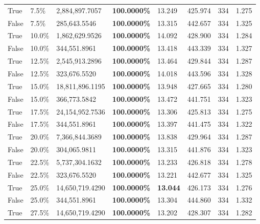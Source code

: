\begin{table}[H]
\begin{tabular}{lllrllll}
\cline{1-8}
True & 7.5\% & 2,884,897.7057 & \bfseries \color{red} 100.0000\% & 13.249 & 425.974 & 334 & 1.275 \\
\cline{1-8}
False & 7.5\% & \color{red} 285,643.5546 & \bfseries \color{red} 100.0000\% & 13.315 & 442.657 & 334 & 1.325 \\
\cline{1-8}
True & 10.0\% & 1,862,629.9526 & \bfseries \color{red} 100.0000\% & 14.092 & 428.900 & 334 & 1.284 \\
\cline{1-8}
False & 10.0\% & 344,551.8961 & \bfseries \color{red} 100.0000\% & 13.418 & 443.339 & 334 & 1.327 \\
\cline{1-8}
True & 12.5\% & 2,545,913.2896 & \bfseries \color{red} 100.0000\% & 13.464 & 429.844 & 334 & 1.287 \\
\cline{1-8}
False & 12.5\% & 323,676.5520 & \bfseries \color{red} 100.0000\% & 14.018 & 443.596 & 334 & 1.328 \\
\cline{1-8}
True & 15.0\% & 18,811,896.1195 & \bfseries \color{red} 100.0000\% & 13.948 & 427.665 & 334 & 1.280 \\
\cline{1-8}
False & 15.0\% & 366,773.5842 & \bfseries \color{red} 100.0000\% & 13.472 & 441.751 & 334 & 1.323 \\
\cline{1-8}
True & 17.5\% & 24,154,952.7536 & \bfseries \color{red} 100.0000\% & 13.306 & 425.813 & 334 & 1.275 \\
\cline{1-8}
False & 17.5\% & 344,551.8961 & \bfseries \color{red} 100.0000\% & 13.397 & 441.475 & 334 & 1.322 \\
\cline{1-8}
True & 20.0\% & 7,366,844.3689 & \bfseries \color{red} 100.0000\% & 13.838 & 429.964 & 334 & 1.287 \\
\cline{1-8}
False & 20.0\% & 304,065.9811 & \bfseries \color{red} 100.0000\% & 13.315 & 441.876 & 334 & 1.323 \\
\cline{1-8}
True & 22.5\% & 5,737,304.1632 & \bfseries \color{red} 100.0000\% & 13.233 & 426.818 & 334 & 1.278 \\
\cline{1-8}
False & 22.5\% & 323,676.5520 & \bfseries \color{red} 100.0000\% & 13.221 & 442.677 & 334 & 1.325 \\
\cline{1-8}
True & 25.0\% & 14,650,719.4290 & \bfseries \color{red} 100.0000\% & \bfseries \color{red} 13.044 & 426.173 & 334 & 1.276 \\
\cline{1-8}
False & 25.0\% & 344,551.8961 & \bfseries \color{red} 100.0000\% & 13.304 & 444.860 & 334 & 1.332 \\
\cline{1-8}
True & 27.5\% & 14,650,719.4290 & \bfseries \color{red} 100.0000\% & 13.202 & 428.307 & 334 & 1.282 \\

\end{tabular}
\end{table}
